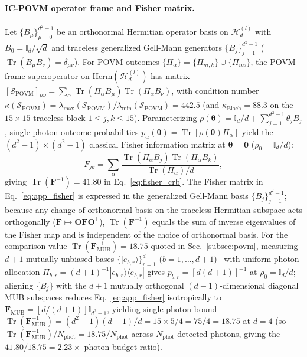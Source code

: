 \documentclass[aps,pra,reprint,nofootinbib,floatfix,longbibliography]{revtex4-2}
\newcommand{\ket}[1]{| #1 \rangle}
\newcommand{\bra}[1]{\langle #1 |}
\begin{document}
\paragraph*{IC-POVM operator frame and Fisher matrix.}
Let $\{B_\mu\}_{\mu=0}^{d^2-1}$ be an orthonormal Hermitian operator basis on $\mathcal{H}_d^{(l)}$ with $B_0 = \mathbb{I}_d/\sqrt{d}$ and traceless generalized Gell-Mann generators $\{B_j\}_{j=1}^{d^2-1}$ ($\operatorname{Tr}(B_\mu B_\nu) = \delta_{\mu\nu}$). For POVM outcomes $\{\Pi_\alpha\} = \{\Pi_{m,k}\} \cup \{\Pi_{\mathrm{res}}\}$, the POVM frame superoperator on $\mathrm{Herm}(\mathcal{H}_d^{(l)})$ has matrix $[\mathcal{S}_{\mathrm{POVM}}]_{\mu\nu} = \sum_\alpha \operatorname{Tr}(\Pi_\alpha B_\mu)\operatorname{Tr}(\Pi_\alpha B_\nu)$, with condition number $\kappa(\mathcal{S}_{\mathrm{POVM}}) = \lambda_{\max}(\mathcal{S}_{\mathrm{POVM}})/\lambda_{\min}(\mathcal{S}_{\mathrm{POVM}}) = 442.5$ (and $\kappa_{\mathrm{Bloch}} = 88.3$ on the $15\times 15$ traceless block $1 \le j,k \le 15$). Parameterizing $\rho(\boldsymbol{\theta}) = \mathbb{I}_d/d + \sum_{j=1}^{d^2-1}\theta_j B_j$, single-photon outcome probabilities $p_\alpha(\boldsymbol{\theta}) = \operatorname{Tr}[\rho(\boldsymbol{\theta})\Pi_\alpha]$ yield the $(d^2-1)\times(d^2-1)$ classical Fisher information matrix at $\boldsymbol{\theta} = \mathbf{0}$ ($\rho_0 = \mathbb{I}_d/d$):
\begin{equation}
F_{jk} = \sum_\alpha \frac{\operatorname{Tr}(\Pi_\alpha B_j)\operatorname{Tr}(\Pi_\alpha B_k)}{\operatorname{Tr}(\Pi_\alpha)/d},
\label{eq:app_fisher}
\end{equation}
giving $\operatorname{Tr}(\mathbf{F}^{-1}) = 41.80$ in Eq.~\eqref{eq:fisher_crb}. The Fisher matrix in Eq.~\eqref{eq:app_fisher} is expressed in the generalized Gell-Mann basis $\{B_j\}_{j=1}^{d^2-1}$; because any change of orthonormal basis on the traceless Hermitian subspace acts orthogonally ($\mathbf{F} \mapsto \mathbf{O}\mathbf{F}\mathbf{O}^{\mathsf{T}}$), $\operatorname{Tr}(\mathbf{F}^{-1})$ equals the sum of inverse eigenvalues of the Fisher map and is independent of the choice of orthonormal basis. For the comparison value $\operatorname{Tr}(\mathbf{F}_{\mathrm{MUB}}^{-1}) = 18.75$ quoted in Sec.~\ref{subsec:povm}, measuring $d + 1$ mutually unbiased bases $\{\ket{e_{b,r}}\}_{r=1}^d$ ($b = 1,\dots,d+1$)~\cite{WoottersFields1989} with uniform photon allocation $\Pi_{b,r} = (d+1)^{-1}\ket{e_{b,r}}\bra{e_{b,r}}$ gives $p_{b,r} = [d(d+1)]^{-1}$ at $\rho_0 = \mathbb{I}_d/d$; aligning $\{B_j\}$ with the $d+1$ mutually orthogonal $(d-1)$-dimensional diagonal MUB subspaces reduces Eq.~\eqref{eq:app_fisher} isotropically to $\mathbf{F}_{\mathrm{MUB}} = [d/(d+1)]\mathbb{I}_{d^2-1}$, yielding single-photon bound $\operatorname{Tr}(\mathbf{F}_{\mathrm{MUB}}^{-1}) = (d^2 - 1)(d + 1)/d = 15\times 5/4 = 75/4 = 18.75$ at $d = 4$ (so $\operatorname{Tr}(\mathbf{F}_{\mathrm{MUB}}^{-1})/N_{\mathrm{phot}} = 18.75/N_{\mathrm{phot}}$ across $N_{\mathrm{phot}}$ detected photons, giving the $41.80/18.75 = 2.23\times$ photon-budget ratio).
\end{document}
